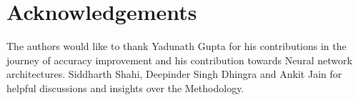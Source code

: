 \section{Acknowledgements}
The authors would like to thank Yadunath Gupta for his contributions in the journey of accuracy improvement and
his contribution towards Neural network architectures. Siddharth Shahi, Deepinder Singh Dhingra and Ankit Jain 
for helpful discussions and insights over the Methodology.